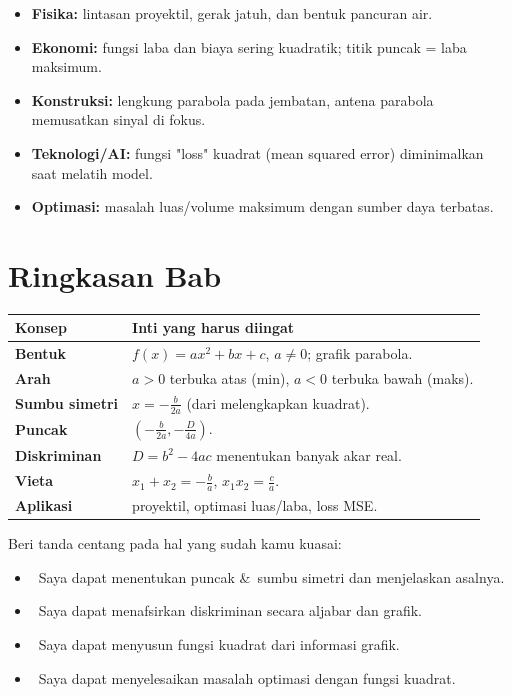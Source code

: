 \documentclass[11pt,a4paper]{report}
\theoremstyle{gaya}
\newcommand{\cek}{\ding{113}\ } %
\begin{document}
\begin{dunianyata}
\begin{itemize}[leftmargin=*,topsep=2pt]
  \item \textbf{Fisika:} lintasan proyektil, gerak jatuh, dan bentuk pancuran air.
  \item \textbf{Ekonomi:} fungsi laba dan biaya sering kuadratik; titik puncak = laba maksimum.
  \item \textbf{Konstruksi:} lengkung parabola pada jembatan, antena parabola memusatkan sinyal di fokus.
  \item \textbf{Teknologi/AI:} fungsi "loss" kuadrat (mean squared error) diminimalkan saat melatih model.
  \item \textbf{Optimasi:} masalah luas/volume maksimum dengan sumber daya terbatas.
\end{itemize}
\end{dunianyata}

\section*{Ringkasan Bab}
\begin{center}
\begin{tabular}{>{\bfseries}p{3.5cm} p{10.2cm}}
\toprule
Konsep & Inti yang harus diingat \\
\midrule
Bentuk & $f(x)=ax^2+bx+c$, $a\neq0$; grafik parabola. \\
Arah & $a>0$ terbuka atas (min), $a<0$ terbuka bawah (maks). \\
Sumbu simetri & $x=-\tfrac{b}{2a}$ (dari melengkapkan kuadrat). \\
Puncak & $\left(-\tfrac{b}{2a},-\tfrac{D}{4a}\right)$. \\
Diskriminan & $D=b^2-4ac$ menentukan banyak akar real. \\
Vieta & $x_1+x_2=-\tfrac ba$, $x_1x_2=\tfrac ca$. \\
Aplikasi & proyektil, optimasi luas/laba, loss MSE. \\
\bottomrule
\end{tabular}
\end{center}

\begin{refleksi}
Beri tanda centang pada hal yang sudah kamu kuasai:
\begin{itemize}[leftmargin=*,label={},topsep=2pt]
  \item \cek Saya dapat menentukan puncak \&\ sumbu simetri dan menjelaskan asalnya.
  \item \cek Saya dapat menafsirkan diskriminan secara aljabar dan grafik.
  \item \cek Saya dapat menyusun fungsi kuadrat dari informasi grafik.
  \item \cek Saya dapat menyelesaikan masalah optimasi dengan fungsi kuadrat.
\end{itemize}
\end{refleksi}
\end{document}
